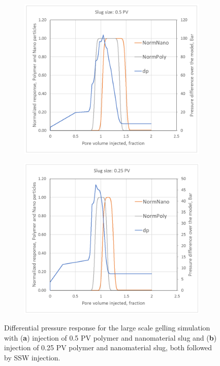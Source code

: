 \documentclass[energies,article,submit,moreauthors,pdftex]{Definitions/mdpi}
\begin{document}
\begin{figure}[h!] %
    \centering
    \begin{subfigure}[b]{.49\textwidth}
    \includegraphics[width=\textwidth]{fig/pDiff1.png}
    \caption{}
    \label{cht:pDiff1}
    \end{subfigure}
    \begin{subfigure}[b]{.49\textwidth}
    \includegraphics[width=\textwidth]{fig/pDiff2.png}
    \caption{}
    \label{cht:pDiff2}
    \end{subfigure}
    
    \caption{Differential pressure response for the large scale gelling simulation with (\textbf{a}) injection of 0.5 PV polymer and nanomaterial slug and (\textbf{b}) injection of 0.25 PV polymer and nanomaterial slug, both followed by SSW injection. }
    \label{cht:pDiff}
\end{figure}
\end{document}
